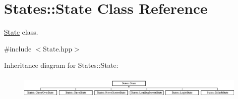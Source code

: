 \hypertarget{class_states_1_1_state}{}\section{States\+::State Class Reference}
\label{class_states_1_1_state}


\mbox{\hyperlink{class_states_1_1_state}{State}} class.  




{\ttfamily \#include $<$State.\+hpp$>$}

Inheritance diagram for States\+::State\+:\begin{figure}[H]
\begin{center}
\leavevmode
\includegraphics[height=1.072797cm]{class_states_1_1_state}
\end{center}
\end{figure}
